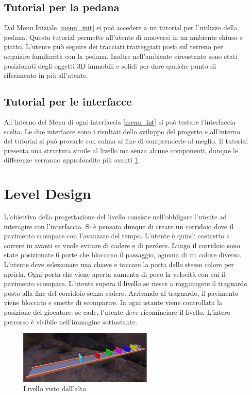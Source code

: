\documentclass[target=bach,aauheader=]{thud}
\begin{document}
\subsection{Tutorial per la pedana}
\label{tut_ped}
Dal Menu Iniziale \ref{menu_init} si può accedere a un tutorial per l'utilizzo della pedana.
Questo tutorial permette all'utente di muoversi in un ambiente chiuso e piatto.
L'utente può seguire dei tracciati tratteggiati posti sul terreno per acquisire familiarità con la pedana.
Inoltre nell'ambiente circostante sono stati posizionati degli oggetti 3D immobili e solidi per dare qualche punto di riferimento in più all'utente. 

\subsection{Tutorial per le interfacce}
\label{tut_int}
All'interno del Menu di ogni interfaccia \ref{menu_int} si può testare l'interfaccia scelta.
Le due interfacce sono i risultati dello sviluppo del progetto e all'interno del tutorial si può provarle con calma al fine di comprenderle al meglio.
Il tutorial presenta una struttura simile al livello ma senza alcune componenti, dunque le differenze verranno approfondite più avanti \ref{level}. 

\section{Level Design}
\label{level}
L'obiettivo della progettazione del livello consiste nell'obbligare l'utente ad interagire con l'interfaccia.
Si è pensato dunque di creare un corridoio dove il pavimento scompare con l'avanzare del tempo.
L'utente è quindi costretto a correre in avanti se vuole evitare di cadere e di perdere.
Lungo il corridoio sono state posizionate 6 porte che bloccano il passaggio, ognuna di un colore diverso.
L'utente deve selezionare una chiave e toccare la porta dello stesso colore per aprirla.
Ogni porta che viene aperta aumenta di poco la velocità con cui il pavimento scompare.
L'utente supera il livello se riesce a raggiungere il traguardo posto alla fine del corridoio senza cadere.
Arrivando al traguardo, il pavimento viene bloccato e smette di scomparire.
In ogni istante viene controllata la posizione del giocatore; se cade, l'utente deve ricominciare il livello.
L'intero percorso è visibile nell'immagine sottostante.

\begin{figure}[h]
    \centering
    \includegraphics[width=0.60\textwidth]{level}
    \caption{Livello visto dall'alto}
    \label{fig:level}
\end{figure}
\end{document}
